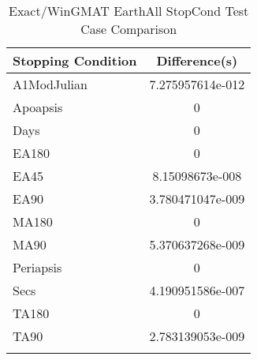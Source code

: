 \begin{table}[htbp!]
\centering
\caption{ Exact/WinGMAT EarthAll StopCond Test Case Comparison}
      \begin{tabular}{lc}
      \hline\hline
          Stopping Condition & Difference(s) \\
         \hline
         A1ModJulian & 7.275957614e-012 \\
         Apoapsis & 0 \\
         Days & 0 \\
         EA180 & 0 \\
         EA45 & 8.15098673e-008 \\
         EA90 & 3.780471047e-009 \\
         MA180 & 0 \\
         MA90 & 5.370637268e-009 \\
         Periapsis & 0 \\
         Secs & 4.190951586e-007 \\
         TA180 & 0 \\
         TA90 & 2.783139053e-009 \\
      \hline\hline
      \label{Table: Exact-WinGMAT EarthAll StopCond Table} 
\end{tabular}
\end{table}
